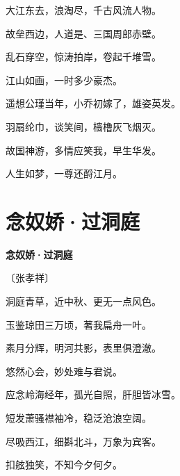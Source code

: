 \documentclass[12pt,UTF-8,openany,fontset=none]{ctexbook}
\begin{document}
\begin{center}
    \begin{Large}

        大江东去，浪淘尽，千古风流人物。

        故垒西边，人道是、三国周郎赤壁。

        乱石穿空，惊涛拍岸，卷起千堆雪。

        江山如画，一时多少豪杰。

        \vspace{18pt}  %

        遥想公瑾当年，小乔初嫁了，雄姿英发。

        羽扇纶巾，谈笑间，樯橹灰飞烟灭。

        故国神游，多情应笑我，早生华发。

        人生如梦，一尊还酹江月。

    \end{Large}

\end{center}

\vspace{8pt}
\clearpage

\section{念奴娇·过洞庭}


\begin{center}
    {\bfseries 念奴娇·过洞庭}

    \vspace{18pt}

    \begin{large}\xuwen
        〔张孝祥〕
    \end{large}

\end{center}

    \vspace{18pt}  %

\begin{center}
    \begin{Large}

        洞庭青草，近中秋、更无一点风色。

        玉鉴琼田三万顷，著我扁舟一叶。

        素月分辉，明河共影，表里俱澄澈。

        悠然心会，妙处难与君说。

        \vspace{18pt}  %

        应念岭海经年，孤光自照，肝胆皆冰雪。

        短发萧骚襟袖冷，稳泛沧浪空阔。

        尽吸西江，细斟北斗，万象为宾客。

        扣舷独笑，不知今夕何夕。

    \end{Large}

\end{center}
\end{document}
